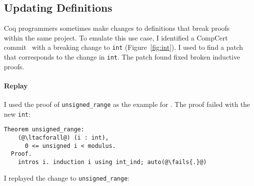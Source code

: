 
\begin{figure*}
\begin{minipage}{0.49\textwidth}
\vspace{-0.42cm}
\vspace{-0.42cm}

\end{minipage}
\hfill
\begin{minipage}{0.49\textwidth}
\vspace{-0.42cm}
\vspace{-0.42cm}

\end{minipage}
\caption[Caption for LOF]{Old (left) and new (right) definitions of \lstinline{int} in CompCert.}
\label{fig:int}
\end{figure*}

\subsection{Updating Definitions}
\label{sec:compcert}

Coq programmers sometimes make changes to definitions that break proofs
within the same project. To emulate this use case, 
I identified a CompCert commit~\cite{compcertcommit}
with a breaking change to \lstinline{int} (Figure~\ref{fig:int}). %
I used \sysname to find a patch that corresponds to the change in \lstinline{int}.
The patch \sysname found fixed broken inductive proofs.

\paragraph{Replay} I used the proof of \lstinline{unsigned_range} as the example for \sysname.
The proof failed with the new \lstinline{int}:

\begin{lstlisting}[language=coq]
  Theorem unsigned_range:
    (@\ltacforall@) (i : int),
      0 <= unsigned i < modulus.
  Proof.
    intros i. induction i using int_ind; auto(@\fails{.}@)
\end{lstlisting}
I replayed the change to \lstinline{unsigned_range}:

